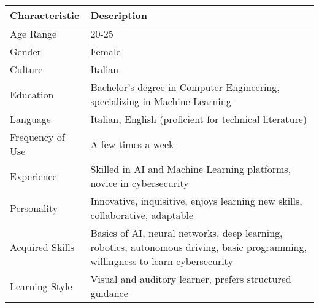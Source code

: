 \begin{center}
    \begin{tabular}{|l|p{10cm}|}
    \hline
    \textbf{Characteristic} & \textbf{Description} \\
    \hline
    Age Range & 20-25 \\
    \hline
    Gender & Female \\
    \hline
    Culture & Italian \\
    \hline
    Education & Bachelor's degree in Computer Engineering, specializing in Machine Learning \\
    \hline
    Language & Italian, English (proficient for technical literature) \\
    \hline
    Frequency of Use & A few times a week \\
    \hline
    Experience & Skilled in AI and Machine Learning platforms, novice in cybersecurity \\
    \hline
    Personality & Innovative, inquisitive, enjoys learning new skills, collaborative, adaptable \\
    \hline
    Acquired Skills & Basics of AI, neural networks, deep learning, robotics, autonomous driving, basic programming, willingness to learn cybersecurity \\
    \hline
    Learning Style & Visual and auditory learner, prefers structured guidance \\
    \hline
    \end{tabular}
    \end{center}